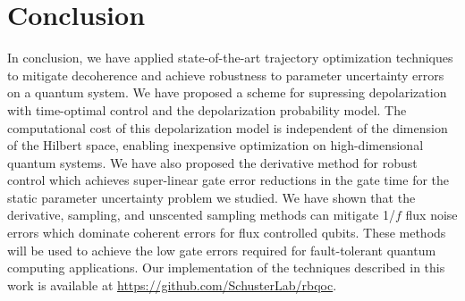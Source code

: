 \section{Conclusion}
In conclusion, we have applied state-of-the-art trajectory
optimization techniques to mitigate decoherence and
achieve robustness to parameter uncertainty
errors on a quantum system.
We have proposed a scheme for supressing
depolarization with time-optimal
control and the depolarization probability model.
The computational cost of this depolarization model is
independent of the dimension of the Hilbert space, enabling
inexpensive optimization on high-dimensional quantum systems.
We have also proposed the derivative method for robust control which achieves
super-linear gate error reductions in the gate time for the static parameter
uncertainty problem we studied.
We have shown that the derivative, sampling, and unscented sampling methods
can mitigate 1/$f$ flux noise errors
which dominate coherent errors for flux controlled qubits.
These methods will be used to achieve the low gate errors
required for fault-tolerant quantum computing applications. Our
implementation of the techniques described in this work is available
at \url{https://github.com/SchusterLab/rbqoc}.
